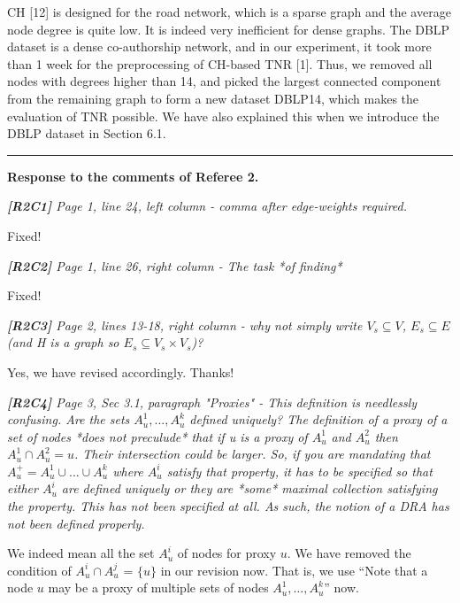 \documentclass[11pt]{letter}
\newcommand{\vs}{\vspace{1ex}}
\newcommand{\svs}{\vspace{0.36ex}}
\begin{document}
\svs
CH [12] is designed for the road network, which is a sparse graph and the average node degree is quite low. It is indeed very inefficient for dense graphs. The DBLP dataset is a dense co-authorship network, and in our experiment, it took more than 1 week for the preprocessing of CH-based TNR [1]. Thus, we removed all nodes with degrees higher than 14, and picked the largest connected component from the remaining graph to form a new dataset DBLP14, which makes the evaluation of TNR possible. We have also explained this when we introduce the DBLP dataset in Section 6.1.





\vspace{2.8ex}
\hrule
\vspace{0.6ex}
{\bf Response to the comments of Referee 2.}



\vs
\noindent
{\em
{\bf [R2C1]}
 Page 1, line 24, left column - comma after edge-weights required.}
\svs

Fixed!

\vs
\noindent
{\em
{\bf [R2C2]} Page 1, line 26, right column - The task *of finding*}
\svs

Fixed!

\vs
\noindent
{\em
{\bf [R2C3]} Page 2, lines 13-18, right column - why not simply write $V_s \subseteq V$, $E_s \subseteq E$ (and H is a graph so $E_s \subseteq V_s \times V_s$)?
}
\svs

Yes, we have revised accordingly. Thanks!


\vs
\noindent
{\em{\bf[R2C4]} Page 3, Sec 3.1, paragraph "Proxies" - This definition is needlessly confusing. Are the sets $A_u^1, ..., A_u^k$ defined uniquely? The definition of a proxy of a set of nodes *does not preculude* that
if u is a proxy of $A_u^1$ and $A_u^2$ then $A_u^1 \cap A_u^2 = {u}$.
Their intersection could be larger. So, if you are mandating that
$A_u^+ = A_u^1 \cup ... \cup A_u^k$ where $A_u^i$ satisfy that property,
it has to be specified so that either $A_u^i$ are defined uniquely or
they are *some* maximal collection satisfying the property. This
has not been specified at all. As such, the notion of a DRA has
not been defined properly.}
\svs

We indeed mean all the set $A_u^i$ of nodes for proxy $u$. We have removed the condition of $A^i_u\cap A^j_u$ = $\{u\}$ in our revision now.
%
That is, we use ``Note that a node $u$ may be a proxy of multiple sets of nodes $A^1_u, \ldots, A^k_u$'' now.
\end{document}

